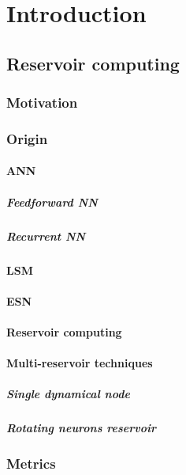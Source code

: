 \chapter{Introduction}\label{ch:Introduction}

\section{Reservoir computing}\label{sec:RC}
\subsection{Motivation}
\subsection{Origin}
\subsubsection{ANN}
\paragraph{Feedforward NN}
\paragraph{Recurrent NN}
\subsubsection{LSM}
\subsubsection{ESN}
\subsubsection{Reservoir computing}
\subsubsection{Multi-reservoir techniques}
\paragraph{Single dynamical node}
\paragraph{Rotating neurons reservoir}
\subsection{Metrics}
